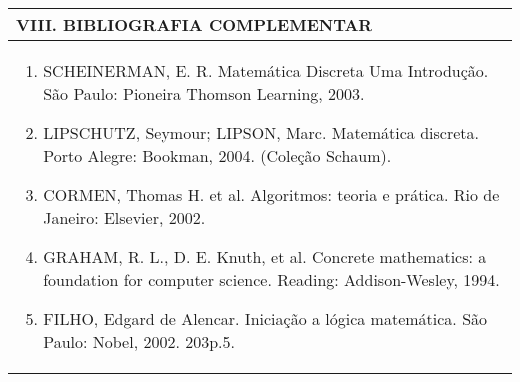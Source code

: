 \documentclass[12pt]{article}
\begin{document}

\begin{longtable}{|L{1.025\textwidth}|} \hline
%
{\bf VIII. BIBLIOGRAFIA COMPLEMENTAR} \\ \hline
\begin{enumerate}

\item SCHEINERMAN, E. R. Matemática Discreta Uma Introdução. São Paulo: Pioneira Thomson Learning, 2003. 
\item LIPSCHUTZ, Seymour; LIPSON, Marc. Matemática discreta. Porto Alegre: Bookman, 2004. (Coleção Schaum). 
\item CORMEN, Thomas H. et al. Algoritmos: teoria e prática. Rio de Janeiro: Elsevier, 2002.
\item GRAHAM, R. L., D. E. Knuth, et al. Concrete mathematics: a foundation for computer science. Reading: Addison-Wesley, 1994. 
\item FILHO, Edgard de Alencar. Iniciação a lógica matemática. São Paulo: Nobel, 2002. 203p.5.
%
\end{enumerate}
 \\ \hline
\end{longtable}



\end{document}
